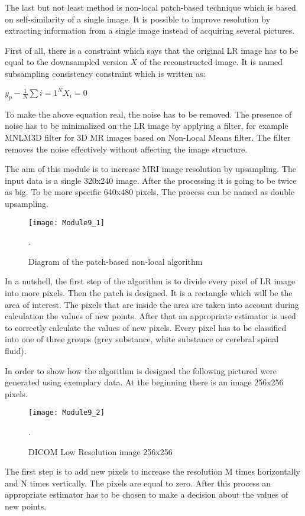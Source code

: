 The last but not least method is non-local patch-based technique which is based on self-similarity of a single image. It is possible to improve resolution by extracting information from a single image instead of acquiring several pictures.

First of all, there is a constraint which says that the original LR image has to be equal to the downsampled version $X$ of the reconstructed image. It is named subsampling consistency constraint which is written as:
\newline \centerline{$y_{p}-\frac{1}{N}\sum{i=1}^{N}X_{i}=0$}
\newline To make the above equation real, the noise has to be removed. The presence of noise has to be minimalized on the LR image by applying a filter, for example MNLM3D filter for 3D MR images based on Non-Local Means filter. The filter removes the noise effectively without affecting the image structure. 


The aim of this module is to increase MRI image resolution by upsampling.
The input data is a single 320x240 image. After the processing it
is going to be twice as big. To be more specific 640x480 pixels. The
process can be named as double upsampling.

\begin{figure}[H]
\centering{}\texttt{[image: Module9\_1]}\caption{Diagram of the patch-based non-local algorithm \cite{9art1}}. 
\label{fig: Module9_1}
\end{figure}

In a nutshell, the first step of the algorithm is to divide every pixel of LR image into more pixels. Then the patch is designed. It is a rectangle which will be the area of interest. The pixels that are inside the area are taken into account during calculation the values of new points.
After that an appropriate estimator is used to correctly calculate the values of new pixels. Every pixel has to be classified into one of three groups (grey substance, white substance or cerebral spinal fluid).

In order to show how the algorithm is designed the following pictured were generated using exemplary data. At the beginning there is an image 256x256 pixels. 

\begin{figure}[H]
\centering{}\texttt{[image: Module9\_2]}\caption{DICOM Low Resolution image 256x256}. 
\label{fig: Module9_2}
\end{figure}

The first step is to add new pixels to increase the resolution M times horizontally and N times vertically. The pixels are equal to zero. After this process an appropriate estimator has to be chosen to make a decision about the values of new points.

